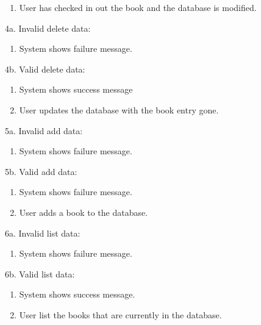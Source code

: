 \documentclass[a4paper, 10pt, oneside, draft]{article}
\begin{document}
\begin{usecase}
{\begin{enumerate}[1.]
		\item User has checked in out the book and the database is modified.
		\end{enumerate}
	\item[4a.] Invalid delete data:
        \begin{enumerate}[1.]
		\item System shows failure message.
		\end{enumerate}
	\item[4b.] Valid delete data:
        \begin{enumerate}[1.]
		\item System shows success message
		\item User updates the database with the book entry gone.
		\end{enumerate}
	\item[5a.] Invalid add data:
        \begin{enumerate}[1.]
		\item System shows failure message.
		\end{enumerate}
	\item[5b.] Valid add data:
        \begin{enumerate}[1.]
		\item System shows failure message.
		\item User adds a book to the database.
		\end{enumerate}
	\item[6a.] Invalid list data:
        \begin{enumerate}[1.]
		\item System shows failure message.
		\end{enumerate}
	\item[6b.] Valid list data:
        \begin{enumerate}[1.]
		\item System shows success message.
		\item User list the books that are currently in the database.
		\end{enumerate}
}





\end{usecase}
\newpage
\end{document}
